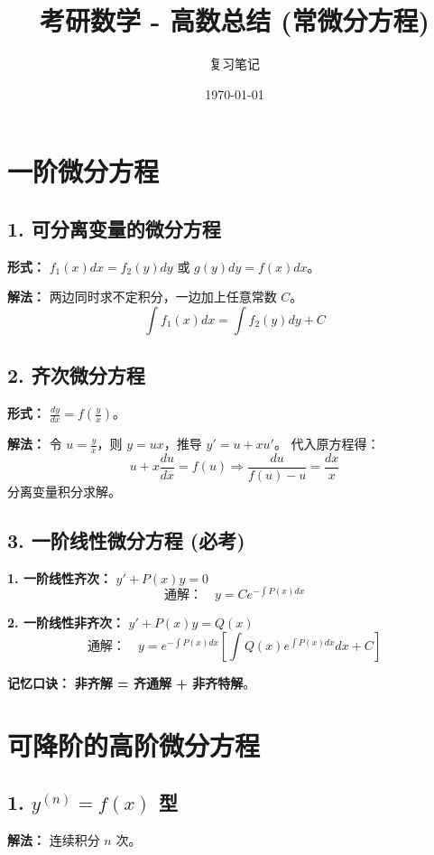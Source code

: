\documentclass[a4paper,12pt]{ctexart}
\title{\textbf{考研数学 - 高数总结 (常微分方程)}}
\author{复习笔记}
\date{\today}
\newenvironment{purplebox}
  {\begin{tcolorbox}[colback=white, colframe=boxpurple, boxrule=1pt, sharp corners, title=\textbf{核心公式}]}
  {\end{tcolorbox}}
\begin{document}
\maketitle
\tableofcontents
\newpage

\section{一阶微分方程}

\subsection{1. 可分离变量的微分方程}
\textbf{形式：} $f_1(x)dx = f_2(y)dy$ 或 $g(y)dy = f(x)dx$。

\textbf{解法：} 两边同时求不定积分，一边加上任意常数 $C$。
\[ \int f_1(x) dx = \int f_2(y) dy + C \]

\subsection{2. 齐次微分方程}
\textbf{形式：} $\frac{dy}{dx} = f\left(\frac{y}{x}\right)$。

\textbf{解法：}
令 $u = \frac{y}{x}$，则 $y = ux$，推导 $y' = u + x u'$。
代入原方程得：
\[ u + x \frac{du}{dx} = f(u) \Rightarrow \frac{du}{f(u) - u} = \frac{dx}{x} \]
分离变量积分求解。

\subsection{3. 一阶线性微分方程 (必考)}

\begin{purplebox}
    \textbf{1. 一阶线性齐次：} $y' + P(x)y = 0$
    \[ \text{通解：} \quad y = C e^{-\int P(x) dx} \]

    \textbf{2. 一阶线性非齐次：} $y' + P(x)y = Q(x)$
    \[ \text{通解：} \quad y = e^{-\int P(x) dx} \left[ \int Q(x) e^{\int P(x) dx} dx + C \right] \]
\end{purplebox}

\textbf{记忆口诀：} \textbf{非齐解 = 齐通解 + 非齐特解}。

\section{可降阶的高阶微分方程}

\subsection{1. $y^{(n)} = f(x)$ 型}
\textbf{解法：} 连续积分 $n$ 次。
\end{document}
